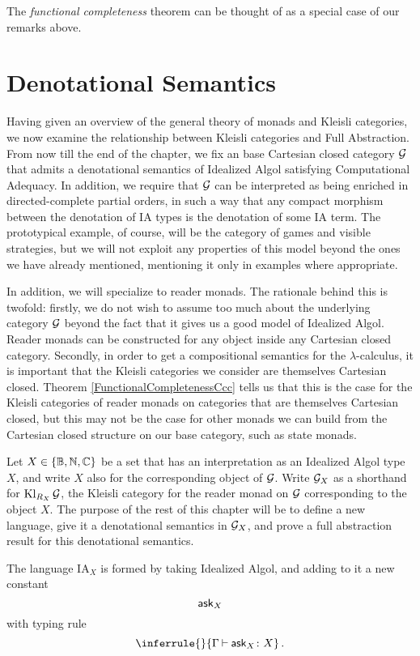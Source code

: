 \documentclass[11pt]{report}
\begin{document}
The \emph{functional completeness} theorem \cite{FunctionalCompleteness} can be thought of as a special case of our remarks above.

\section{Denotational Semantics}

Having given an overview of the general theory of monads and Kleisli categories, we now examine the relationship between Kleisli categories and Full Abstraction.  From now till the end of the chapter, we fix an base Cartesian closed category $\mathcal G$ that admits a denotational semantics of Idealized Algol satisfying Computational Adequacy.  
In addition, we require that $\mathcal G$ can be interpreted as being enriched in directed-complete partial orders, in such a way that any compact morphism between the denotation of IA types is the denotation of some IA term.
The prototypical example, of course, will be the category of games and visible strategies, but we will not exploit any properties of this model beyond the ones we have already mentioned, mentioning it only in examples where appropriate.

In addition, we will specialize to reader monads.  
The rationale behind this is twofold: firstly, we do not wish to assume too much about the underlying category $\mathcal G$ beyond the fact that it gives us a good model of Idealized Algol.  
Reader monads can be constructed for any object inside any Cartesian closed category.
Secondly, in order to get a compositional semantics for the $\lambda$-calculus, it is important that the Kleisli categories we consider are themselves Cartesian closed.  
Theorem \ref{FunctionalCompletenessCcc} tells us that this is the case for the Kleisli categories of reader monads on categories that are themselves Cartesian closed, but this may not be the case for other monads we can build from the Cartesian closed structure on our base category, such as state monads.

Let $X\in \{\mathbb{B},\mathbb{N},\mathbb{C}\}$ be a set that has an interpretation as an Idealized Algol type $X$, and write $X$ also for the corresponding object of $\mathcal G$.
Write $\mathcal G_X$ as a shorthand for $\operatorname{Kl}_{R_X}\mathcal G$, the Kleisli category for the reader monad on $\mathcal G$ corresponding to the object $X$.  
The purpose of the rest of this chapter will be to define a new language, give it a denotational semantics in $\mathcal G_X$, and prove a full abstraction result for this denotational semantics.

\newcommand{\IAX}{{IA${}_X$}\xspace}
\begin{definition}[{The language \IAX}]
  The language \IAX is formed by taking Idealized Algol, and adding to it a new constant
  \[
    \operatorname{{\mathsf{ask}}}_X
    \]
  with typing rule
  \[
    \inferrule{ }{\Gamma \ts \ask_X \from X}\,.
    \]
\end{definition}
\end{document}
